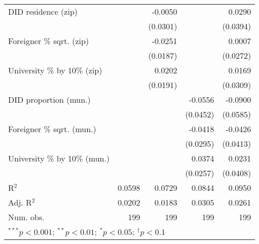 \begin{tabular}{l D{.}{.}{3.11} D{.}{.}{3.11} D{.}{.}{3.11} D{.}{.}{3.11}}
DID residence (zip)               &                  & -0.0050          &                  & 0.0290           \\
                                  &                  & (0.0301)         &                  & (0.0394)         \\
Foreigner \% sqrt. (zip)          &                  & -0.0251          &                  & 0.0007           \\
                                  &                  & (0.0187)         &                  & (0.0272)         \\
University \% by 10\% (zip)       &                  & 0.0202           &                  & 0.0169           \\
                                  &                  & (0.0191)         &                  & (0.0309)         \\
DID proportion (mun.)             &                  &                  & -0.0556          & -0.0900          \\
                                  &                  &                  & (0.0452)         & (0.0585)         \\
Foreigner \% sqrt. (mun.)         &                  &                  & -0.0418          & -0.0426          \\
                                  &                  &                  & (0.0295)         & (0.0413)         \\
University \% by 10\% (mun.)      &                  &                  & 0.0374           & 0.0231           \\
                                  &                  &                  & (0.0257)         & (0.0408)         \\
\midrule
R$^2$                             & 0.0598           & 0.0729           & 0.0844           & 0.0950           \\
Adj. R$^2$                        & 0.0202           & 0.0183           & 0.0305           & 0.0261           \\
Num. obs.                         & 199              & 199              & 199              & 199              \\
\bottomrule
{}
\end{tabular}
